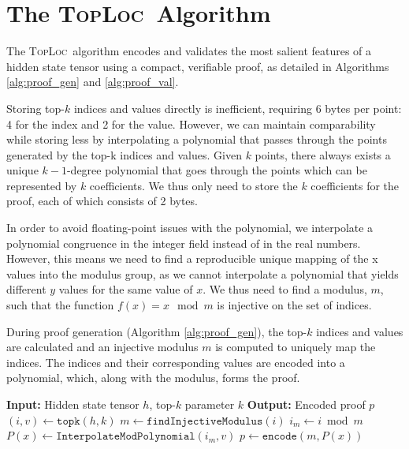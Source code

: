 \documentclass{article}
\theoremstyle{plain}
\theoremstyle{definition}
\theoremstyle{remark}
\newcommand{\toploc}{\textsc{TopLoc}}
\begin{document}
\vspace{-6pt}
\section{The \toploc\ Algorithm}

The \toploc\ algorithm encodes and validates the most salient features of a hidden state tensor using a compact, verifiable proof, as detailed in Algorithms \ref{alg:proof_gen} and \ref{alg:proof_val}.

Storing top-$k$ indices and values directly is inefficient, requiring 6 bytes per point: 4 for the index and 2 for the value.
However, we can maintain comparability while storing less by interpolating a polynomial that passes through the points generated by the top-k indices and values.
Given $k$ points, there always exists a unique $k - 1$-degree polynomial that goes through the points which can be represented by $k$ coefficients.
We thus only need to store the $k$ coefficients for the proof, each of which consists of 2 bytes.

In order to avoid floating-point issues with the polynomial, we interpolate a polynomial congruence in the integer field instead of in the real numbers.
However, this means we need to find a reproducible unique mapping of the x values into the modulus group, as we cannot interpolate a polynomial that yields different $y$ values for the same value of $x$.
We thus need to find a modulus, $m$, such that the function $f(x) = x \mod m$ is injective on the set of indices.

During proof generation (Algorithm \ref{alg:proof_gen}), the top-$k$ indices and values are calculated and an injective modulus $m$ is computed to uniquely map the indices.
The indices and their corresponding values are encoded into a polynomial, which, along with the modulus, forms the proof.

\begin{algorithm}[h]
    \caption{\toploc\ Proof Generation Algorithm}
    \label{alg:proof_gen}
\begin{algorithmic}[1]
    \STATE \textbf{Input:} Hidden state tensor $h$, top-$k$ parameter $k$
    \STATE \textbf{Output:} Encoded proof $p$
    \STATE
    \STATE $(i, v) \gets \texttt{topk}(h, k)$ 
    \STATE $m \gets \texttt{findInjectiveModulus}(i)$
    \STATE $i_m \gets i \bmod{m}$
    \STATE $P(x) \gets \texttt{InterpolateModPolynomial}(i_m, v)$
    \STATE $p \gets \texttt{encode}(m, P(x))$
\end{algorithmic}
\end{algorithm}
\end{document}
